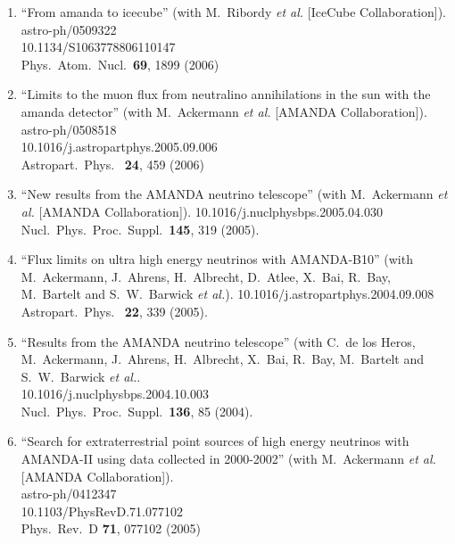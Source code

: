 \begin{enumerate}


\item ``From amanda to icecube'' (with M.~Ribordy {\it et al.}  [IceCube
  Collaboration]).  \\{}astro-ph/0509322 \\{}10.1134/S1063778806110147
  \\{}Phys.\ Atom.\ Nucl.\ {\bf 69}, 1899 (2006) %


\item ``Limits to the muon flux from neutralino annihilations in the sun
  with the amanda detector'' (with M.~Ackermann {\it et al.}  [AMANDA
    Collaboration]).  \\{}astro-ph/0508518
  \\{}10.1016/j.astropartphys.2005.09.006 \\{}Astropart.\ Phys.\ {\bf
    24}, 459 (2006) %


\item ``New results from the AMANDA neutrino telescope'' (with M.~Ackermann
  {\it et al.}  [AMANDA Collaboration]). 10.1016/j.nuclphysbps.2005.04.030
  \\{}Nucl.\ Phys.\ Proc.\ Suppl.\ {\bf 145}, 319 (2005). %


\item ``Flux limits on ultra high energy neutrinos with AMANDA-B10'' (with M.~Ackermann, J.~Ahrens, H.~Albrecht, D.~Atlee, X.~Bai, R.~Bay,
  M.~Bartelt and S.~W.~Barwick {\it et al.}). 10.1016/j.astropartphys.2004.09.008 \\{}Astropart.\ Phys.\ {\bf
    22}, 339 (2005). %


\item ``Results from the AMANDA neutrino telescope'' (with C.~de los Heros,
  M.~Ackermann, J.~Ahrens, H.~Albrecht, X.~Bai, R.~Bay, M.~Bartelt and
  S.~W.~Barwick {\it et al.}.  \\{}10.1016/j.nuclphysbps.2004.10.003
  \\{}Nucl.\ Phys.\ Proc.\ Suppl.\ {\bf 136}, 85 (2004). %


\item ``Search for extraterrestrial point sources of high energy neutrinos
  with AMANDA-II using data collected in 2000-2002'' (with M.~Ackermann
  {\it et al.}  [AMANDA Collaboration]).  \\{}astro-ph/0412347
  \\{}10.1103/PhysRevD.71.077102 \\{}Phys.\ Rev.\ D {\bf 71}, 077102
  (2005) %



\end{enumerate}
